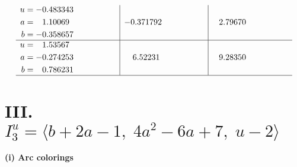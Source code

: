 \documentclass[1p]{elsarticle_modified}
\theoremstyle{definition}
\begin{document}
$$\begin{array}{c|c|c}
\begin{aligned}
u &= -0.483343\phantom{ +0.000000I} \\
a &= \phantom{-}1.10069\phantom{ +0.000000I} \\
b &= -0.358657\phantom{ +0.000000I}\end{aligned}
 & -0.371792\phantom{ +0.000000I} & \phantom{-}2.79670\phantom{ +0.000000I} \\ \hline\begin{aligned}
u &= \phantom{-}1.53567\phantom{ +0.000000I} \\
a &= -0.274253\phantom{ +0.000000I} \\
b &= \phantom{-}0.786231\phantom{ +0.000000I}\end{aligned}
 & \phantom{-}6.52231\phantom{ +0.000000I} & \phantom{-}9.28350\phantom{ +0.000000I}\\
 \hline 
 \end{array}$$\newpage\newpage\renewcommand{\arraystretch}{1}
\centering \section*{III. $I^u_{3}= \langle b+2 a-1,\;4 a^2-6 a+7,\;u-2 \rangle$}
\flushleft \textbf{(i) Arc colorings}\\
\end{document}
